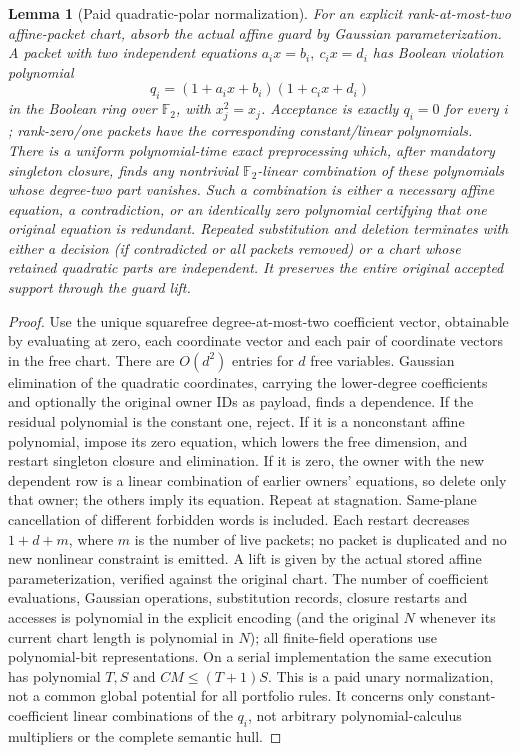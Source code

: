 \documentclass[11pt]{article}
\newtheorem{lemma}[theorem]{Lemma}
\begin{document}
\begin{lemma}[Paid quadratic-polar normalization]\label{lem:ba15-polar}
For an explicit rank-at-most-two affine-packet chart, absorb the actual affine guard by Gaussian parameterization. A packet with two independent equations $a_i x=b_i,\ c_i x=d_i$ has Boolean violation polynomial
\[
 q_i=(1+a_i x+b_i)(1+c_i x+d_i)
\]
in the Boolean ring over $\mathbb F_2$, with $x_j^2=x_j$. Acceptance is exactly $q_i=0$ for every $i$; rank-zero/one packets have the corresponding constant/linear polynomials. There is a uniform polynomial-time exact preprocessing which, after mandatory singleton closure, finds any nontrivial $\mathbb F_2$-linear combination of these polynomials whose degree-two part vanishes. Such a combination is either a necessary affine equation, a contradiction, or an identically zero polynomial certifying that one original equation is redundant. Repeated substitution and deletion terminates with either a decision (if contradicted or all packets removed) or a chart whose retained quadratic parts are independent. It preserves the entire original accepted support through the guard lift.
\end{lemma}
\begin{proof}
Use the unique squarefree degree-at-most-two coefficient vector, obtainable by evaluating at zero, each coordinate vector and each pair of coordinate vectors in the free chart. There are $O(d^2)$ entries for $d$ free variables. Gaussian elimination of the quadratic coordinates, carrying the lower-degree coefficients and optionally the original owner IDs as payload, finds a dependence. If the residual polynomial is the constant one, reject. If it is a nonconstant affine polynomial, impose its zero equation, which lowers the free dimension, and restart singleton closure and elimination. If it is zero, the owner with the new dependent row is a linear combination of earlier owners' equations, so delete only that owner; the others imply its equation. Repeat at stagnation. Same-plane cancellation of different forbidden words is included. Each restart decreases $1+d+m$, where $m$ is the number of live packets; no packet is duplicated and no new nonlinear constraint is emitted. A lift is given by the actual stored affine parameterization, verified against the original chart. The number of coefficient evaluations, Gaussian operations, substitution records, closure restarts and accesses is polynomial in the explicit encoding (and the original $N$ whenever its current chart length is polynomial in $N$); all finite-field operations use polynomial-bit representations. On a serial implementation the same execution has polynomial $T,S$ and $CM\le(T+1)S$. This is a paid unary normalization, not a common global potential for all portfolio rules. It concerns only constant-coefficient linear combinations of the $q_i$, not arbitrary polynomial-calculus multipliers or the complete semantic hull.
\end{proof}
\end{document}
